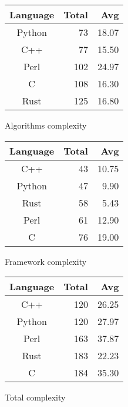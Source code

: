 \begin{subtable}{0.33\textwidth}
    \centering
    \begin{tabular}{|c|r|r|}
        \hline
        Language & Total & Avg \\
        \hline
        Python & 73 & 18.07 \\
        C++ & 77 & 15.50 \\
        Perl & 102 & 24.97 \\
        C & 108 & 16.30 \\
        Rust & 125 & 16.80 \\
        \hline
    \end{tabular}
    \caption{Algorithms complexity}
    \label{table:cyclomatic:algorithm}
\end{subtable}%
\begin{subtable}{0.33\textwidth}
    \centering
    \begin{tabular}{|c|r|r|}
        \hline
        Language & Total & Avg \\
        \hline
        C++ & 43 & 10.75 \\
        Python & 47 & 9.90 \\
        Rust & 58 & 5.43 \\
        Perl & 61 & 12.90 \\
        C & 76 & 19.00 \\
        \hline
    \end{tabular}
    \caption{Framework complexity}
    \label{table:cyclomatic:framework}
\end{subtable}%
\begin{subtable}{0.33\textwidth}
    \centering
    \begin{tabular}{|c|r|r|}
        \hline
        Language & Total & Avg \\
        \hline
        C++ & 120 & 26.25 \\
        Python & 120 & 27.97 \\
        Perl & 163 & 37.87 \\
        Rust & 183 & 22.23 \\
        C & 184 & 35.30 \\
        \hline
    \end{tabular}
    \caption{Total complexity}
    \label{table:cyclomatic:total}
\end{subtable}

